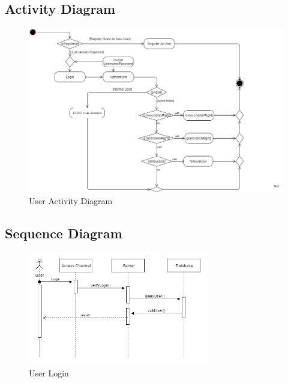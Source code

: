 %
%
%
\subsection{Activity Diagram}

\begin{figure}[H]
		\centering
		\includegraphics[width=\textwidth]{user/img/UserActivityDiagram.jpg}
		\caption{User Activity Diagram}
\end{figure}


\subsection{Sequence Diagram}

\begin{figure}[H]
		\centering
		\includegraphics[width=0.7\textwidth]{user/img/UserSequence.jpg}
		\caption{User Login}
\end{figure}



